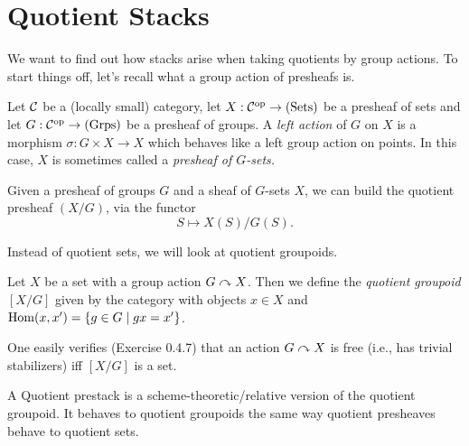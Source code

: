 \documentclass[a4paper,11pt]{article}
\begin{document}
\section{Quotient Stacks} 
We want to find out how stacks arise when taking quotients by group actions.
To start things off, let's recall what a group action of presheafs is. 
\begin{defi}
    Let $\mathcal{C}$ be a (locally small) category, let $X: \mathcal{C}^{\mathrm{op}} \to (\mathrm{Sets})$ be a 
    presheaf of sets and let $G: \mathcal{C}^{\mathrm{op}} \to \textnormal{(Grps)}$ be a presheaf of groups. 
    A \textit{left action} of $G$ on $X$ is a morphism $\sigma: G \times X \to X$
    which behaves like a left group action on points. In this case, $X$ is sometimes
    called a \textit{presheaf of $G$-sets.}
\end{defi}

\begin{defi}
    Given a presheaf of groups $G$ and a sheaf of $G$-sets $X$, we can build the
    quotient presheaf $(X/G)$, via the functor
    \begin{equation*}
        S \mapsto X(S)/G(S).
    \end{equation*}
\end{defi}

Instead of quotient sets, we will look at quotient groupoids.
\begin{defi}
    Let $X$ be a set with a group action $G \curvearrowright X$. Then we define
    the \textit{quotient groupoid} $[X/G]$ given by the category with
    objects $x \in X$ and $\operatorname{Hom}(x,x') = \{g \in G \mid gx = x'\}$. 
\end{defi}
One easily verifies (Exercise 0.4.7) that an action $G \curvearrowright X$ is free (i.e.,
has trivial stabilizers) iff $[X/G]$ is a set.

A Quotient prestack is a scheme-theoretic/relative version of the quotient groupoid.
It behaves to quotient groupoids the same way quotient presheaves behave to 
quotient sets.
\end{document}
